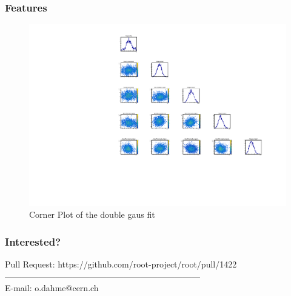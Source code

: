 \documentclass{beamer}
\begin{document}
\begin{frame}
 \frametitle{Features}

 \begin{figure}
  \includegraphics[width=0.8\linewidth]{figures/twogausCorner}
  \caption{Corner Plot of the double gaus fit}
 \end{figure}

\end{frame}

\begin{frame}
 \frametitle{Interested?}


   \centering Pull Request: https://github.com/root-project/root/pull/1422 \\
    --------------------------------------------------------------------- \\
   \centering E-mail: o.dahme@cern.ch

\end{frame}
\end{document}
